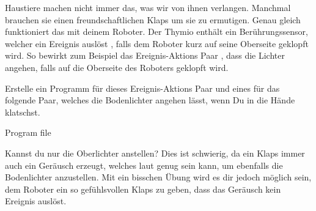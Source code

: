 


Haustiere machen nicht immer das,
was wir von ihnen verlangen.
Manchmal brauchen sie einen freundschaftlichen Klaps um sie zu ermutigen.
Genau gleich funktioniert das mit deinem Roboter.
Der Thymio enthält ein Berührungssensor, welcher ein Ereignis auslöst , falls dem Roboter kurz auf seine Oberseite geklopft wird. So bewirkt zum Beispiel das Ereignis-Aktions Paar , dass die Lichter angehen, falls auf die Oberseite des Roboters geklopft wird.

Erstelle ein Programm für dieses Ereignis-Aktions Paar
und eines für das folgende Paar, welches die Bodenlichter angehen lässt,
wenn Du in die Hände klatschst.

{\raggedleft \hfill Program file }

Kannst du nur die Oberlichter anstellen?
Dies ist schwierig, da ein Klaps immer auch ein Geräusch erzeugt,
welches laut genug sein kann, um ebenfalls die Bodenlichter anzustellen.
Mit ein bisschen Übung wird es dir jedoch möglich sein,
dem Roboter ein so gefühlsvollen Klaps zu geben,
dass das Geräusch kein Ereignis auslöst.

